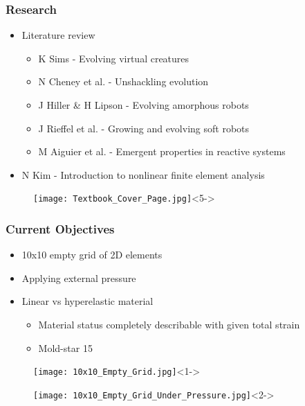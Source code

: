\documentclass[serif, pdf]{beamer}
\begin{document}
\begin{frame}
    \frametitle{Research}
    \begin{minipage}{0.7\textwidth}
        \begin{itemize}
            \item<1-> Literature review
            \changefontsizes{11pt}
            \begin{itemize}
                \item<2-> K Sims - Evolving virtual creatures
                \item<3-> N Cheney et al. - Unshackling evolution
                \item<3-> J Hiller \& H Lipson - Evolving amorphous robots
                \item<3-> J Rieffel et al. - Growing and evolving soft robots
                \item<4-> M Aiguier et al. - Emergent properties in reactive systems
            \end{itemize}
            \item<5-> N Kim - Introduction to nonlinear finite element analysis
        \end{itemize}
    \end{minipage}
    \begin{minipage}{0.25\textwidth}
        \begin{figure}
            \texttt{[image: Textbook\_Cover\_Page.jpg]}<5->
        \end{figure}
    \end{minipage}
\end{frame}


\begin{frame}
    \frametitle{Current Objectives}
    \begin{itemize}
        \item<1-> 10x10 empty grid of 2D elements
        \item<2-> Applying external pressure
        \item<3-> Linear vs hyperelastic material
        \changefontsizes{11pt}
        \begin{itemize}
            \item<4-> Material status completely describable with given total strain
            \item<5-> Mold-star 15
        \end{itemize}
    \end{itemize}
    \begin{subfigure}{.5\textwidth}
        \centering
        \texttt{[image: 10x10\_Empty\_Grid.jpg]}<1->
        \label{fig:basic_model}
    \end{subfigure}%
    \begin{subfigure}{.5\textwidth}
        \centering
        \texttt{[image: 10x10\_Empty\_Grid\_Under\_Pressure.jpg]}<2->
        \label{fig:basic_model_pressure}
    \end{subfigure}
\end{frame}
\end{document}
